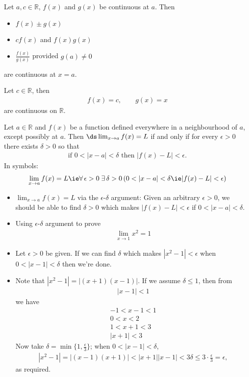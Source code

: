 \begin{theorem}
Let $a,c \in \mathbb{R}$, $f(x)$ and $g(x)$ be continuous at $a$. Then
\begin{itemize}
\item $f(x) \pm g(x)$
\item $c f(x)$ and $f(x) g(x)$
\item $\frac{f(x)}{g(x)}$ provided $g(a)\neq 0$
\end{itemize}
are continuous at $x=a$.
\end{theorem}
\begin{lemma}
Let $c \in \mathbb{R}$, then
\begin{align*}
f(x) = c,\qquad g(x) = x
\end{align*}
are continuous on $\mathbb{R}$.
\end{lemma}
\begin{defn}
Let $a \in \mathbb{R}$ and %
$f(x)$ be a function defined everywhere in a neighbourhood of $a$, except possibly at $a$. %
Then $\ds\lim_{x \to a} f(x) = L$ if and only if for every $\epsilon >0$ there exists $\delta>0$ so that
\begin{align*}
  \text{if } 0 < |x-a| < \delta \text{ then } |f(x) - L| <\epsilon.
\end{align*}
In symbols:
\begin{align*}
  \lim_{x \to a} f(x) = L \ie \forall\,\epsilon > 0\;\exists\,\delta > 0\,(0 < |x - a| < \delta \ie |f(x) - L| < \epsilon)
\end{align*}
\end{defn}
\begin{itemize}
\item $\lim_{x \to a} f(x) = L$ via the $\epsilon$-$\delta$ argument: Given an arbitrary $\epsilon > 0$, we should be able to find $\delta > 0$ which makes $|f(x) - L|< \epsilon$ if $0 < |x - a| < \delta$.
\end{itemize}
\begin{itemize}
\item Using $\epsilon$-$\delta$ argument to prove
\begin{align*}
\lim_{x\to 1}x^2 = 1
\end{align*}
\item
Let $\epsilon > 0$ be given. If we can find $\delta$ which makes $|x^2 - 1| < \epsilon$ when $0 < |x - 1| < \delta$ then we're done.
\item Note that $|x^2 - 1| = |(x + 1)(x - 1)|$. If we assume $\delta\leqslant 1$, then from
\begin{align*}
|x - 1| < 1
\end{align*}
we have
\begin{gather*}
-1 < x - 1 < 1 \\
0 < x < 2 \\
1 < x + 1 < 3 \\
|x + 1| < 3
\end{gather*}
Now take $\delta = \min\{1, \frac{\epsilon}{3}\}$; when $0 < |x - 1| < \delta$,
\begin{align*}
|x^2 - 1| = |(x - 1)(x + 1)| < |x + 1||x - 1| < 3\delta \leqslant 3\cdot\frac{\epsilon}{3}= \epsilon,
\end{align*}
as required.
\end{itemize}
